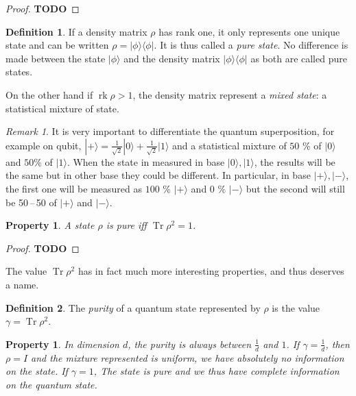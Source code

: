 \documentclass[10pt]{report}
\theoremstyle{plain}
\newtheorem{prop}[thm]{Property}
\theoremstyle{definition}
\newtheorem{defn}{Definition}[chapter]
\theoremstyle{remark}
\newtheorem*{rem}{Remark}
\newcommand{\TODO}{\textbf{TODO}}
\newcommand{\ket}[1]{|#1\rangle}
\newcommand{\bra}[1]{\langle#1|}
\DeclareMathOperator{\Tr}{Tr}
\DeclareMathOperator{\rk}{rk}
\begin{document}
\begin{proof}
   \TODO
\end{proof}

\begin{defn}
  If a density matrix $\rho$ has rank one, it only represents one unique state and can be written
  $\rho = \ket \phi \bra \phi$. It is thus called a \emph{pure state}. No
  difference is made between the state $\ket \phi$ and the density matrix $\ket
  \phi \bra \phi$ as both are called pure states.

  On the other hand if $\rk \rho > 1$, the density matrix represent a
  \emph{mixed state}: a statistical mixture of state.
\end{defn}

\begin{rem}
  It is very important to differentiate the quantum superposition, for example
  on qubit,
  $\ket + = \frac1{\sqrt 2} \ket 0 + \frac1{\sqrt2} \ket 1$ and a statistical mixture of
  $50$ \% of $\ket 0$ and $50$\% of $\ket 1$. When the state in measured in base
  $\ket0,\ket1$, the results will be the same but in other base they could be
  different. In particular, in base $\ket +, \ket -$, the first one will be
  measured as $100$ \% $\ket +$ and $0$ \% $\ket -$ but the second will still be
  50\,--\,50 of $\ket+$ and $\ket -$.
\end{rem}

\begin{prop}
  A state $\rho$ is pure iff $\Tr \rho^2 = 1$.
\end{prop}

\begin{proof}
   \TODO
\end{proof}

The value $\Tr \rho^2$ has in fact much more interesting properties, and thus
deserves a name.

\begin{defn}
  The \emph{purity} of a quantum state represented by $\rho$ is the value $\gamma = \Tr \rho^2$.
\end{defn}

\begin{prop}
  In dimension $d$, the purity is always between $\frac1d$ and $1$. If $\gamma =
  \frac1d$, then $\rho = I$ and the mixture represented is uniform, we have
  absolutely no information on the state. If $\gamma = 1$, The state is pure and
  we thus have complete information on the quantum state.
\end{prop}
\end{document}
